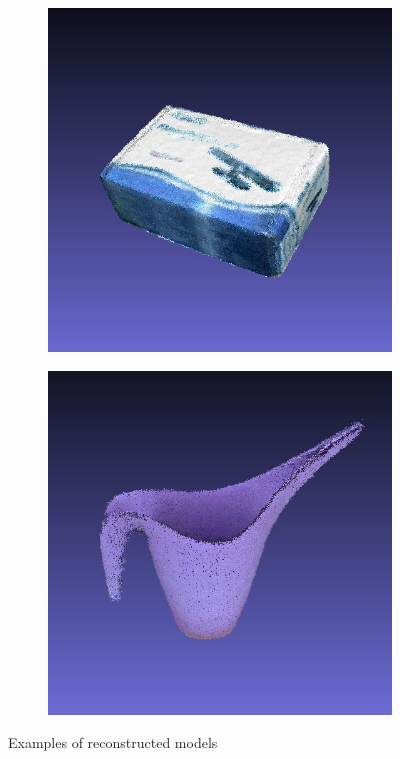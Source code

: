\documentclass[letterpaper, 10 pt, conference]{ieeeconf}  %
\begin{document}
\begin{figure}[th]
        \begin{subfigure}[b]{0.5\linewidth}
                \centering
                \includegraphics[width=\linewidth]{../models/asus_box.jpg}
        \end{subfigure}%
        \begin{subfigure}[b]{0.5\linewidth}
                \centering
                \includegraphics[width=\linewidth]{../models/watering_can.jpg}
        \end{subfigure}
        \caption{Examples of reconstructed models}
        \label{fig:results}
\end{figure}
\end{document}
